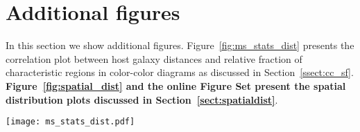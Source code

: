 \documentclass[linenumbers]{aastex63}
\begin{document}
\appendix
\section{Additional figures}\label{append:add_fig}
{In this section we show additional figures. Figure~\ref{fig:ms_stats_dist} presents the correlation plot between host galaxy distances and relative fraction of characteristic regions in color-color diagrams as discussed in Section~\ref{ssect:cc_sf}. \textbf{Figure~\ref{fig:spatial_dist} and the online Figure Set present the spatial distribution plots discussed in Section~\ref{sect:spatialdist}}.}
\begin{figure*}
\texttt{[image: ms\_stats\_dist.pdf]}
 \caption{{Number fraction of C1 and C2 clusters of each galaxy associated with the main characteristic regions in color-color diagrams found in Section~\ref{ssect:cc_regions} as a function of galaxy distance. We show the YCL, the MAP and the OGC in blue, green and red, respectively. In gray, we show clusters outside the main regions. We distinguish distance measurements which are estimated from stellar markers such as Tip of the Red giant Branch (TRGB) or from Cepheid variable stars are marked with full circles whereas other distant measurements which are less precise are marked by empty circles. A complete discussion on each individual distance measurement is provided in \citet{anand_distances_2020} and \citet{anand_distances_2021}. For each panel we show the Pearson correlation coefficient in the top right.}}
 \label{fig:ms_stats_dist}
\end{figure*}
\end{document}
